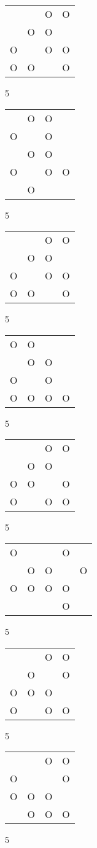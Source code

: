 \begin{tabular}{|m{0.2cm}m{0.2cm}m{0.2cm}m{0.2cm}|}\hline
 & &O&O\\
 &O&O& \\
O& &O&O\\
O&O& &O\\
\hline\end{tabular}5
\begin{tabular}{|m{0.2cm}m{0.2cm}m{0.2cm}m{0.2cm}|}\hline
 &O&O& \\
O& &O& \\
 &O&O& \\
O& &O&O\\
 &O& & \\
\hline\end{tabular}5
\begin{tabular}{|m{0.2cm}m{0.2cm}m{0.2cm}m{0.2cm}|}\hline
 & &O&O\\
 &O&O& \\
O& &O&O\\
O&O& &O\\
\hline\end{tabular}5
\begin{tabular}{|m{0.2cm}m{0.2cm}m{0.2cm}m{0.2cm}|}\hline
O&O& & \\
 &O&O& \\
O& &O& \\
O&O&O&O\\
\hline\end{tabular}5
\begin{tabular}{|m{0.2cm}m{0.2cm}m{0.2cm}m{0.2cm}|}\hline
 & &O&O\\
 &O&O& \\
O&O& &O\\
O& &O&O\\
\hline\end{tabular}5
\begin{tabular}{|m{0.2cm}m{0.2cm}m{0.2cm}m{0.2cm}m{0.2cm}|}\hline
O& & &O& \\
 &O&O& &O\\
O&O&O&O& \\
 & & &O& \\
\hline\end{tabular}5
\begin{tabular}{|m{0.2cm}m{0.2cm}m{0.2cm}m{0.2cm}|}\hline
 & &O&O\\
 &O& &O\\
O&O&O& \\
O& &O&O\\
\hline\end{tabular}5
\begin{tabular}{|m{0.2cm}m{0.2cm}m{0.2cm}m{0.2cm}|}\hline
 & &O&O\\
O& & &O\\
O&O&O& \\
 &O&O&O\\
\hline\end{tabular}5
